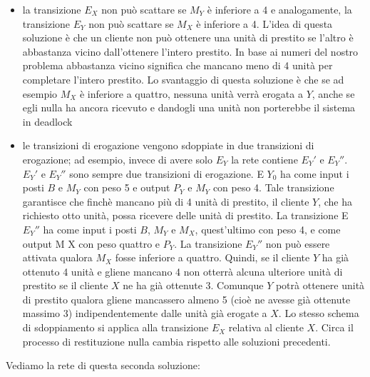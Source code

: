 \documentclass[a4paper,12pt, oneside]{book}
\begin{document}
\begin{itemize}
\item la transizione $E_X$ non può scattare se $M_Y$ è inferiore a 4 e
analogamente, la transizione $E_Y$ non può scattare se $M_X$ è inferiore a 4.
L’idea di questa soluzione è che un cliente non può ottenere una unità di
prestito se l’altro è abbastanza vicino dall’ottenere l’intero prestito. In base
ai numeri del nostro problema abbastanza vicino significa che mancano meno di 4
unità per completare l’intero prestito. Lo svantaggio di questa soluzione è che
se ad esempio $M_X$ è inferiore a quattro, nessuna unità verrà erogata a $Y$,
anche se egli nulla ha ancora ricevuto e dandogli una unità non porterebbe il
sistema in deadlock
\item le transizioni di erogazione vengono sdoppiate in due transizioni di
erogazione; ad esempio, invece di avere solo $E_Y$ la rete contiene $E_Y'$ e
$E_Y''$. $E_Y'$ e $E_Y''$ sono sempre due transizioni di erogazione. E $Y_0$ ha
come input i posti $B$ e $M_Y$ con peso 5 e output $P_Y$ e $M_Y$ con peso
4. Tale transizione garantisce che finchè mancano più di 4 unità di prestito, il
cliente $Y$, che ha richiesto otto unità, possa ricevere delle unità di
prestito. La transizione E $E_Y''$ ha come input i posti $B$, $M_Y$ e $M_X$,
quest’ultimo con peso 4, e come output M X con peso quattro e $P_Y$. La
transizione $E_Y''$ non può essere attivata qualora $M_X$ fosse inferiore a
quattro. Quindi, se il cliente $Y$ ha già ottenuto 4 unità e gliene mancano 4
non otterrà alcuna ulteriore unità di prestito se il cliente $X$ ne ha già
ottenute 3. Comunque $Y$ potrà ottenere unità di prestito qualora gliene
mancassero almeno 5 (cioè ne avesse già ottenute massimo 3) indipendentemente
dalle unità già erogate a $X$. Lo stesso schema di sdoppiamento si applica alla
transizione $E_X$ relativa al cliente $X$. Circa il processo di restituzione
nulla cambia rispetto alle soluzioni precedenti. 
\end{itemize}
\newpage
Vediamo la rete di questa seconda soluzione:
\end{document}
